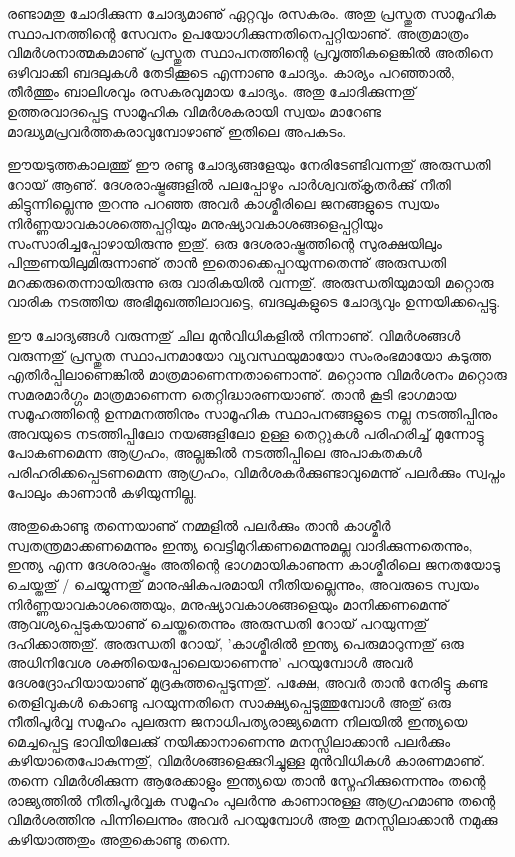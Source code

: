 രണ്ടാമതു ചോദിക്കുന്ന ചോദ്യമാണു് ഏറ്റവും രസകരം. അതു പ്രസ്തുത സാമൂഹിക സ്ഥാപനത്തിന്റെ സേവനം ഉപയോഗിക്കുന്നതിനെപ്പറ്റിയാണു്.
 അത്രമാത്രം വിമര്‍ശനാത്മകമാണു് പ്രസ്തുത സ്ഥാപനത്തിന്റെ പ്രവൃത്തികളെങ്കില്‍ അതിനെ ഒഴിവാക്കി ബദലുകള്‍ തേടിക്കൂടെ എന്നാണു ചോദ്യം.
  കാര്യം പറഞ്ഞാല്‍, തീര്‍ത്തും ബാലിശവും രസകരവുമായ ചോദ്യം. അതു ചോദിക്കുന്നതു് ഉത്തരവാദപ്പെട്ട സാമൂഹിക വിമര്‍ശകരായി 
  സ്വയം മാറേണ്ട മാദ്ധ്യമപ്രവര്‍ത്തകരാവുമ്പോഴാണു് ഇതിലെ അപകടം.

ഈയടുത്തകാലത്തു് ഈ രണ്ടു ചോദ്യങ്ങളേയും നേരിടേണ്ടിവന്നതു് അരുന്ധതി റോയ് ആണു്. ദേശരാഷ്ട്രങ്ങളില്‍ പലപ്പോഴും 
പാര്‍ശ്വവത്കൃതര്‍ക്കു് നീതി കിട്ടുന്നില്ലെന്നു തുറന്നു പറഞ്ഞ അവര്‍ കാശ്മീരിലെ ജനങ്ങളുടെ സ്വയം നിര്‍ണ്ണയാവകാശത്തെപ്പറ്റിയും
 മനുഷ്യാവകാശങ്ങളെപ്പറ്റിയും സംസാരിച്ചപ്പോഴായിരുന്നു ഇതു്. ഒരു ദേശരാഷ്ട്രത്തിന്റെ സുരക്ഷയിലും പിന്തുണയിലുമിരുന്നാണു് 
 താന്‍ ഇതൊക്കെപ്പറയുന്നതെന്നു് അരുന്ധതി മറക്കരുതെന്നായിരുന്നു ഒരു വാരികയില്‍ വന്നതു്. അരുന്ധതിയുമായി മറ്റൊരു 
 വാരിക നടത്തിയ അഭിമുഖത്തിലാവട്ടെ, ബദലുകളുടെ ചോദ്യവും ഉന്നയിക്കപ്പെട്ടു.

ഈ ചോദ്യങ്ങള്‍ വരുന്നതു് ചില മുന്‍വിധികളില്‍ നിന്നാണു്. വിമര്‍ശങ്ങള്‍ വരുന്നതു് പ്രസ്തുത സ്ഥാപനമായോ വ്യവസ്ഥയുമായോ
 സംരംഭമായോ കടുത്ത എതിര്‍പ്പിലാണെങ്കില്‍ മാത്രമാണെന്നതാണൊന്നു്. മറ്റൊന്നു വിമര്‍ശനം മറ്റൊരു സമരമാര്‍ഗ്ഗം
  മാത്രമാണെന്ന തെറ്റിദ്ധാരണയാണു്. താന്‍ കൂടി ഭാഗമായ സമൂഹത്തിന്റെ ഉന്നമനത്തിനും സാമൂഹിക സ്ഥാപനങ്ങളുടെ നല്ല 
  നടത്തിപ്പിനും അവയുടെ നടത്തിപ്പിലോ നയങ്ങളിലോ ഉള്ള തെറ്റുകള്‍ പരിഹരിച്ച് മുന്നോട്ടു പോകണമെന്ന ആഗ്രഹം, അല്ലങ്കില്‍ 
  നടത്തിപ്പിലെ അപാകതകള്‍ പരിഹരിക്കപ്പെടണമെന്ന ആഗ്രഹം, വിമര്‍ശകര്‍ക്കുണ്ടാവുമെന്നു് പലര്‍ക്കും സ്വപ്നം പോലും കാണാന്‍ 
  കഴിയുന്നില്ല.

അതുകൊണ്ടു തന്നെയാണു് നമ്മളില്‍ പലര്‍ക്കും താന്‍ കാശ്മീര്‍ സ്വതന്ത്രമാക്കണമെന്നും ഇന്ത്യ വെട്ടിമുറിക്കണമെന്നുമല്ല 
വാദിക്കുന്നതെന്നും, ഇന്ത്യ എന്ന ദേശരാഷ്ട്രം അതിന്റെ ഭാഗമായികാണുന്ന കാശ്മീരിലെ ജനതയോടു ചെയ്തതു് / ചെയ്യുന്നതു് മാനുഷികപരമായി 
നീതിയല്ലെന്നും, അവരുടെ സ്വയം നിര്‍ണ്ണയാവകാശത്തെയും, മനുഷ്യാവകാശങ്ങളെയും മാനിക്കണമെന്നു് ആവശ്യപ്പെടുകയാണു് ചെയ്തതെന്നും
 അരുന്ധതി റോയ് പറയുന്നതു് ദഹിക്കാത്തതു്. അരുന്ധതി റോയ്, 'കാശ്മീരില്‍ ഇന്ത്യ പെരുമാറുന്നതു് ഒരു അധിനിവേശ ശക്തിയെപ്പോലെയാണെന്നു' 
 പറയുമ്പോള്‍ അവര്‍ ദേശദ്രോഹിയായാണു് മുദ്രകുത്തപ്പെടുന്നതു്. പക്ഷേ, അവര്‍ താന്‍ നേരിട്ടു കണ്ട തെളിവുകള്‍ കൊണ്ടു പറയുന്നതിനെ
  സാക്ഷ്യപ്പെടുത്തുമ്പോള്‍ അതു് ഒരു നീതിപൂര്‍വ്വ സമൂഹം പുലരുന്ന ജനാധിപത്യരാജ്യമെന്ന നിലയില്‍ ഇന്ത്യയെ മെച്ചപ്പെട്ട ഭാവിയിലേക്കു് 
  നയിക്കാനാണെന്നു മനസ്സിലാക്കാന്‍ പലര്‍ക്കും കഴിയാതെപോകുന്നതു്, വിമര്‍ശങ്ങളെക്കുറിച്ചുള്ള മുന്‍വിധികള്‍ കാരണമാണു്.  
  തന്നെ വിമര്‍ശിക്കുന്ന ആരേക്കാളും ഇന്ത്യയെ താന്‍ സ്നേഹിക്കുന്നെന്നും തന്റെ രാജ്യത്തില്‍ നീതിപൂര്‍വ്വക സമൂഹം പുലര്‍ന്നു കാണാനുള്ള 
  ആഗ്രഹമാണു തന്റെ വിമര്‍ശത്തിനു പിന്നിലെന്നും അവര്‍ പറയുമ്പോള്‍ അതു മനസ്സിലാക്കാന്‍ നമുക്കു കഴിയാത്തതും അതുകൊണ്ടു തന്നെ.

